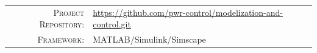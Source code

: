 \documentclass[12pt,a4paper]{scrartcl}
\newcommand{\MetaLabelA}{Project Repository}
\newcommand{\MetaValueA}{https://github.com/pwr-control/modelization-and-control.git}
\newcommand{\MetaLabelB}{Framework}
\newcommand{\MetaValueB}{MATLAB/Simulink/Simscape}
\newcommand{\MetaLabelC}{Architecture}
\newcommand{\MetaValueC}{SiC, EiceDRIVER, Customized Power Supplies}
\begin{document}
\vfill

\noindent
\begin{tabular}{@{} r @{\quad} l @{}}
	\textsc{\small\MetaLabelA:} & {\small\url{\MetaValueA}} \\[3pt]
	\textsc{\small\MetaLabelB:} & {\small\MetaValueB}       \\[3pt]
\end{tabular}

\newpage
{}
\setcounter{page}{1}
\tableofcontents
\listoffigures	
\listoftables
\newpage
\end{document}
